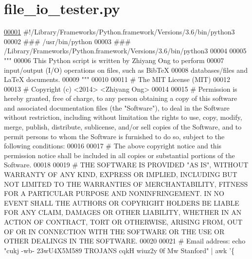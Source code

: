 \hypertarget{file__io__tester_8py_source}{}\section{file\+\_\+io\+\_\+tester.\+py}
\label{file__io__tester_8py_source}

\begin{DoxyCode}
\hypertarget{file__io__tester_8py_source_l00001}{}\hyperlink{namespaceutilities_1_1file__io__tester}{00001} \textcolor{comment}{#!/Library/Frameworks/Python.framework/Versions/3.6/bin/python3}
00002 \textcolor{comment}{### /usr/bin/python}
00003 \textcolor{comment}{### /Library/Frameworks/Python.framework/Versions/3.6/bin/python3}
00004 
00005 \textcolor{stringliteral}{"""}
00006 \textcolor{stringliteral}{    This Python script is written by Zhiyang Ong to perform}
00007 \textcolor{stringliteral}{        input/output (I/O) operations on files, such as BibTeX}
00008 \textcolor{stringliteral}{        databases/files and LaTeX documents.}
00009 \textcolor{stringliteral}{"""}
00010 
00011 \textcolor{comment}{#   The MIT License (MIT)}
00012 
00013 \textcolor{comment}{#   Copyright (c) <2014> <Zhiyang Ong>}
00014 
00015 \textcolor{comment}{#   Permission is hereby granted, free of charge, to any person obtaining a copy of this software and
       associated documentation files (the "Software"), to deal in the Software without restriction, including without
       limitation the rights to use, copy, modify, merge, publish, distribute, sublicense, and/or sell copies of the
       Software, and to permit persons to whom the Software is furnished to do so, subject to the following
       conditions:}
00016 
00017 \textcolor{comment}{#   The above copyright notice and this permission notice shall be included in all copies or substantial
       portions of the Software.}
00018 
00019 \textcolor{comment}{#   THE SOFTWARE IS PROVIDED "AS IS", WITHOUT WARRANTY OF ANY KIND, EXPRESS OR IMPLIED, INCLUDING BUT NOT
       LIMITED TO THE WARRANTIES OF MERCHANTABILITY, FITNESS FOR A PARTICULAR PURPOSE AND NONINFRINGEMENT. IN NO
       EVENT SHALL THE AUTHORS OR COPYRIGHT HOLDERS BE LIABLE FOR ANY CLAIM, DAMAGES OR OTHER LIABILITY, WHETHER IN AN
       ACTION OF CONTRACT, TORT OR OTHERWISE, ARISING FROM, OUT OF OR IN CONNECTION WITH THE SOFTWARE OR THE USE
       OR OTHER DEALINGS IN THE SOFTWARE.}
00020 
00021 \textcolor{comment}{#   Email address: echo "cukj -wb- 23wU4X5M589 TROJANS cqkH wiuz2y 0f Mw Stanford" | awk '\{
}
\end{DoxyCode}
